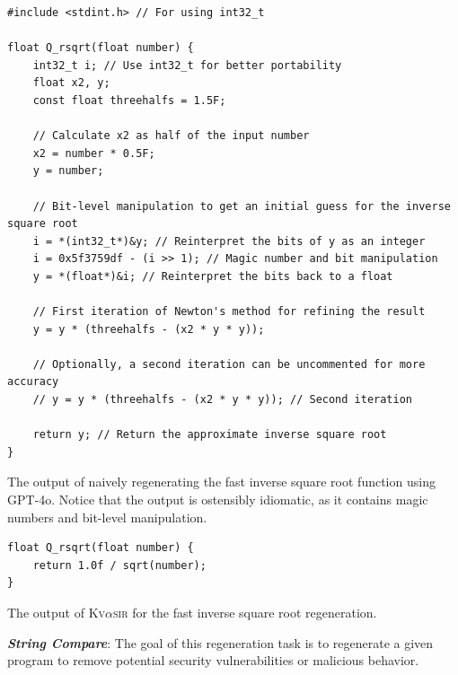\documentclass[nonacm,sigplan,review]{acmart}
\def\gptmodel{{GPT-4o}\xspace}
\newcommand{\sys}{{\scshape Kv{$\alpha$}sir}\xspace}
\newcommand{\heading}[1]{\vspace{2pt}\noindent\textbf{\emph{#1}}:\enspace}
\begin{document}
\begin{listing}[htpb]
\begin{verbatim}
#include <stdint.h> // For using int32_t

float Q_rsqrt(float number) {
    int32_t i; // Use int32_t for better portability
    float x2, y;
    const float threehalfs = 1.5F;

    // Calculate x2 as half of the input number
    x2 = number * 0.5F;
    y = number;

    // Bit-level manipulation to get an initial guess for the inverse square root
    i = *(int32_t*)&y; // Reinterpret the bits of y as an integer
    i = 0x5f3759df - (i >> 1); // Magic number and bit manipulation
    y = *(float*)&i; // Reinterpret the bits back to a float

    // First iteration of Newton's method for refining the result
    y = y * (threehalfs - (x2 * y * y));

    // Optionally, a second iteration can be uncommented for more accuracy
    // y = y * (threehalfs - (x2 * y * y)); // Second iteration

    return y; // Return the approximate inverse square root
}
\end{verbatim}
  \caption{The output of naively regenerating the fast inverse square root function using \gptmodel.
  Notice that the output is ostensibly idiomatic, as it contains magic numbers and bit-level manipulation.}
  \label{lst:fast_inv_sqrt_gpt}
\end{listing}

\begin{listing}[htpb]
\begin{verbatim}
float Q_rsqrt(float number) {
    return 1.0f / sqrt(number);
}
\end{verbatim}
\caption{The output of \sys for the fast inverse square root regeneration.}
  \label{lst:fast_inv_sqrt_sys}
\end{listing}


\heading{String Compare}
The goal of this regeneration task is to regenerate a given
program to remove potential security vulnerabilities or malicious behavior.
\end{document}
